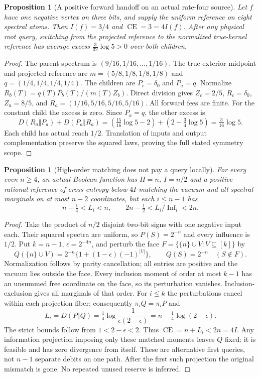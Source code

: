 \documentclass[11pt]{article}
\newtheorem{proposition}[lemma]{Proposition}
\begin{document}
\begin{proposition}[A positive forward handoff on an actual rate-four source]
\label{prop:v12-forward}
Let $f$ have one negative vertex on three bits, and supply the uniform reference on
eight spectral atoms. Then $I(f)=3/4$ and $\operatorname{CE}=3=4I(f)$.
After any physical root query, switching from the projected reference to the normalized
true-kernel reference has average excess $\frac3{32}\log5>0$ over both children.
\end{proposition}
\begin{proof}
The parent spectrum is $(9/16,1/16,\ldots,1/16)$.
The true exterior midpoint and projected reference are
$m=(5/8,1/8,1/8,1/8)$ and $q=(1/4,1/4,1/4,1/4)$.
The children are $P_c=\delta_0$ and $P_a=q$. Normalize
$R_b(T)=q(T)P_b(T)/(m(T)Z_b)$.
Direct division gives $Z_c=2/5$, $R_c=\delta_0$, $Z_a=8/5$, and
$R_a=(1/16,5/16,5/16,5/16)$. All forward fees are finite.
For the constant child the excess is zero. Since $P_a=q$, the other excess is
\[
 D(R_a\Vert P_a)+D(P_a\Vert R_a)
 =\left(\tfrac{15}{16}\log5-2\right)
  +\left(2-\tfrac34\log5\right)=\tfrac3{16}\log5.
\]
Each child has actual reach $1/2$. Translation of inputs and output complementation
preserve the squared laws, proving the full stated symmetry scope.
\end{proof}

\begin{proposition}[High-order matching does not pay a query locally]
\label{prop:v12-moment}
For every even $n\geq4$, an actual Boolean function has $H=n$, $I=n/2$ and a positive
rational reference of cross entropy below $4I$ matching the vacuum and all spectral
marginals on at most $n-2$ coordinates, but each $i\leq n-1$ has
\[
 n-\tfrac14<L_i<n,\qquad 2n-\tfrac12<L_i/\operatorname{Inf}_i<2n.
\]
\end{proposition}
\begin{proof}
Take the product of $n/2$ disjoint two-bit signs with one negative input each.
Their squared spectra are uniform, so $P(S)=2^{-n}$ and every influence is $1/2$.
Put $k=n-1$, $\epsilon=2^{-4n}$, and perturb the face
$F=\{\{n\}\cup V:V\subseteq[k]\}$ by
\[
 Q(\{n\}\cup V)=2^{-n}\{1+(1-\epsilon)(-1)^{|V|}\},
 \qquad Q(S)=2^{-n}\quad(S\notin F).
\]
Normalization follows by parity cancellation; all entries are positive and the
vacuum lies outside the face. Every inclusion moment of order at most $k-1$ has an
unsummed free coordinate on the face, so its perturbation vanishes.
Inclusion-exclusion gives all marginals of that order. For $i\leq k$ the perturbations
cancel within each projection fiber; consequently $\pi_iQ=\pi_iP$ and
\[
 L_i=D(P\Vert Q)=\tfrac14\log\frac1{\epsilon(2-\epsilon)}
                =n-\tfrac14\log(2-\epsilon).
\]
The strict bounds follow from $1<2-\epsilon<2$. Thus $\operatorname{CE}=n+L_i<2n=4I$.
Any information projection imposing only these matched moments leaves $Q$ fixed:
it is feasible and has zero divergence from itself. These are alternative first
queries, not $n-1$ separate debits on one path. After the first such projection the
original mismatch is gone. No repeated unused reserve is inferred.
\end{proof}
\end{document}

